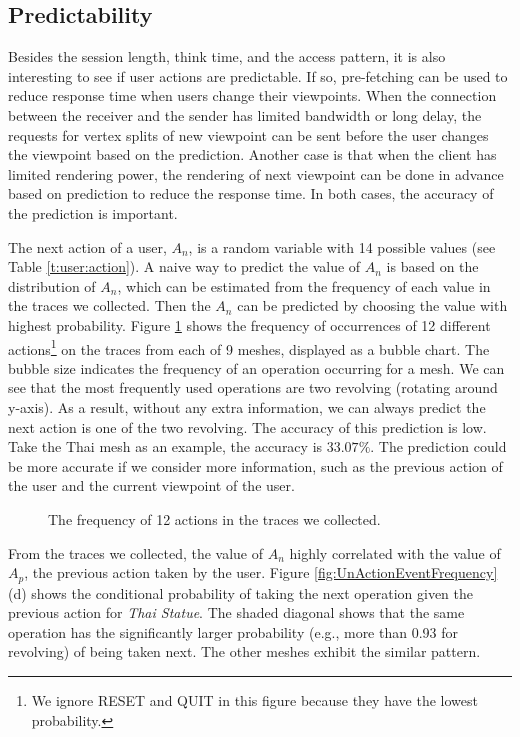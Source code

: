 \subsection{Predictability}
Besides the session length, think time, and the access pattern,
it is also interesting to see if user actions are predictable. 
If so, pre-fetching can be used to reduce response time when
users change their viewpoints. When the connection between the 
receiver and the sender has limited bandwidth
or long delay, the requests for vertex splits of new viewpoint 
can be sent before the user changes the viewpoint based on 
the prediction. Another case is that when the client has limited
rendering power, the rendering of next viewpoint can be done
in advance based on prediction to reduce the response time. 
In both cases, the accuracy of the prediction is important.

The next action of a user, $A_n$, is a random variable with 14 possible values
(see Table \ref{t:user:action}). 
A naive way to predict the value of $A_n$ is based on the distribution 
of $A_n$, which can be estimated from the frequency of each value in the traces we collected.  
Then the $A_n$ can be predicted by choosing the value with highest probability.
Figure \ref{f:user:frequency}
shows the frequency of occurrences of 12 different actions\footnote{We ignore RESET and QUIT 
in this figure because they have the lowest probability.}
on the traces from each of 9 meshes,
displayed as a bubble chart. 
The bubble size indicates the frequency of an operation occurring for a mesh.
We can see that the most frequently used operations are two revolving (rotating around y-axis). 
As a result, without any extra information, we can always predict the next action is 
one of the two revolving.
The accuracy of this prediction is low. 
Take the Thai mesh as an example,
the accuracy is $33.07\%$. %
The prediction could be more accurate if we consider more information,
such as the previous action of the user and the current viewpoint of the user.
\begin{figure}[htdp!]
    \centering
    \caption{The frequency of 12 actions in the traces we collected.}
    \label{f:user:frequency}
\end{figure}

From the traces we collected, the value of $A_n$ highly correlated
with the value of $A_p$, the previous action taken by the user.
Figure \ref{fig:UnActionEventFrequency}(d) shows the conditional 
probability of taking the next operation given the previous action
for \textit{Thai Statue}.
The shaded diagonal shows that the same operation has the 
significantly larger probability (e.g., more than 0.93 for revolving) 
of being taken next. The other meshes exhibit the similar pattern. 

